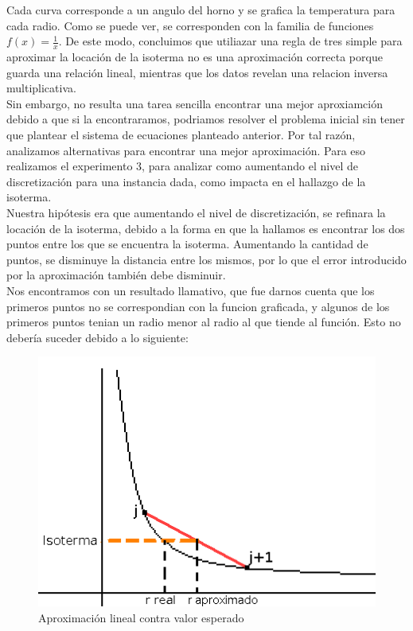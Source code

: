 Cada curva corresponde a un angulo del horno y se grafica la temperatura para cada radio. Como se puede ver, se corresponden con la familia de funciones $f(x)= \frac{1}{x}$. De este modo, concluimos que utiliazar una regla de tres simple para aproximar la locación de la isoterma no es una aproximación correcta porque guarda una relación lineal, mientras que los datos revelan una relacion inversa multiplicativa. \\
Sin embargo, no resulta una tarea sencilla encontrar una mejor aproxiamción debido a que si la encontraramos, podriamos resolver el problema inicial sin tener que plantear el sistema de ecuaciones planteado anterior. Por tal razón, analizamos alternativas para encontrar una mejor aproximación. Para eso realizamos el experimento 3, para analizar como aumentando el nivel de discretización para una instancia dada, como impacta en el hallazgo de la isoterma. \\
Nuestra hipótesis era que aumentando el nivel de discretización, se refinara la locación de la isoterma, debido a la forma en que la hallamos es encontrar los dos puntos entre los que se encuentra la isoterma. Aumentando la cantidad de puntos, se disminuye la distancia entre los mismos, por lo que el error introducido por la aproximación también debe disminuir. \\
Nos encontramos con un resultado llamativo, que fue darnos cuenta que los primeros puntos no se correspondian con la funcion graficada, y algunos de los primeros puntos tenian un radio menor al radio al que tiende al función. Esto no debería suceder debido a lo siguiente: 
\newpage

\begin{figure}
  \vspace{-20pt}
  \begin{center}
    \includegraphics[scale=0.4]{imagenes/aprox.png}
  \end{center}
  \vspace{-20pt}
  \caption{Aproximación lineal contra valor esperado}
  \vspace{-10pt}
  \label{fig:aproximacion}
\end{figure}

